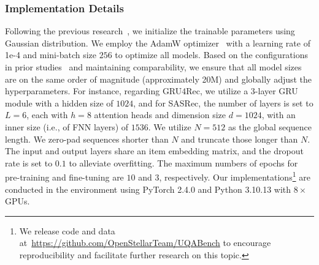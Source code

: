 \subsubsection{\textbf{Implementation Details}}
Following the previous research~\cite{sun2019bert4rec,kang2018self}, we initialize the trainable parameters using Gaussian distribution. We employ the AdamW optimizer~\cite{loshchilov2017decoupled} with a learning rate of 1e-4 and mini-batch size $256$ to optimize all models. Based on the configurations in prior studies~\cite{sun2019bert4rec, zhang2019feature, kang2018self} and maintaining comparability, we ensure that all model sizes are on the same order of magnitude (approximately 20M) and globally adjust the hyperparameters. For instance, regarding GRU4Rec, we utilize a $3$-layer GRU module with a hidden size of $1024$, and for SASRec, the number of layers is set to $L=6$, each with $h=8$ attention heads and dimension size $d=1024$, with an inner size (i.e., of FNN layers) of $1536$. We utilize $N=512$ as the global sequence length. 
We zero-pad sequences shorter than $N$ and truncate those longer than $N$.
The input and output layers share an item embedding matrix, and the dropout rate is set to $0.1$ to alleviate overfitting. The maximum numbers of epochs for pre-training and fine-tuning are $10$ and $3$, respectively. 
Our implementations\footnote{We release code and data at~\url{https://github.com/OpenStellarTeam/UQABench} to encourage reproducibility and facilitate further research on this topic.} are conducted in the environment using PyTorch 2.4.0 and Python 3.10.13 with $8\times$ GPUs.


